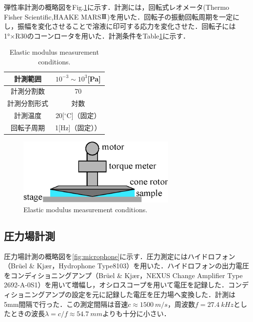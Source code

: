弾性率計測の概略図をFig.\ref{fig:elastic-measure}に示す．計測には，回転式レオメータ(Thermo Fisher Scientific,HAAKE MARS$\rm I\hspace{-.15em}I\hspace{-.15em}I$)を用いた．回転子の振動回転周期を一定にし，振幅を変化させることで溶液に印可する応力を変化させた．回転子には1°×R30のコーンロータを用いた．計測条件をTable\ref{table:elastic}に示す．

\begin{table}[ht]
    \centering
    \caption{Elastic modulus measurement conditions.}
    \label{table:elastic}
    \begin{tabular}{c|c}\hline
        計測範囲     & $10^{-3} \sim 10^3$[Pa] \\ \hline
        計測分割数   & 70                      \\ \hline
        計測分割形式 & 対数                    \\ \hline
        計測温度     & 20[$^\circ$C]（固定）   \\ \hline
        回転子周期   & 1[Hz]（固定））         \\ \hline
    \end{tabular}
\end{table}

\begin{figure}[ht]
    \centering
    \includegraphics[width=0.7\textwidth]{2-Methods/rheometer.eps}
    \caption{Elastic modulus measurement conditions.}
    \label{fig:elastic-measure}
\end{figure}

\newpage

\subsection{圧力場計測}

圧力場計測の概略図を\ref{fig:microphone}に示す．圧力測定にはハイドロフォン（Br\"{u}el \& Kj\ae r，Hydrophone Type8103）を用いた．ハイドロフォンの出力電圧をコンディショニングアンプ（Br\"{u}el \& Kj\ae r，NEXUS Change Amplifier Type 2692-A-0S1）を用いて増幅し，オシロスコープを用いて電圧を記録した．コンディショニングアンプの設定を元に記録した電圧を圧力場へ変換した．計測は5mm間隔で行った．この測定間隔は音速$c\approx \SI{1500}{m/s}$，周波数$f=\SI{27.4}{kHz}$としたときの波長$\lambda=c/f\approx \SI{54.7}{mm}$よりも十分に小さい．

